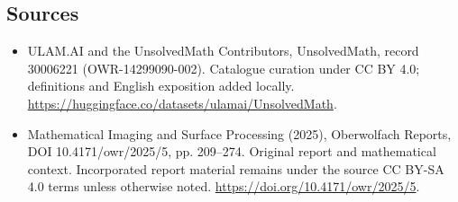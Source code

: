 \documentclass[11pt]{article}
\begin{document}
\subsection{Sources}
\begin{itemize}
\item[\hypertarget{source:30006221:1}{S1}] ULAM.AI and the UnsolvedMath Contributors, UnsolvedMath, record 30006221 (OWR-14299090-002). Catalogue curation under CC BY 4.0; definitions and English exposition added locally.
\url{https://huggingface.co/datasets/ulamai/UnsolvedMath}.
\item[\hypertarget{source:30006221:2}{S2}] Mathematical Imaging and Surface Processing (2025), Oberwolfach Reports, DOI 10.4171/owr/2025/5, pp. 209--274. Original report and mathematical context. Incorporated report material remains under the source CC BY-SA 4.0 terms unless otherwise noted.
\url{https://doi.org/10.4171/owr/2025/5}.
\end{itemize}
\label{end:30006221}
\end{document}
